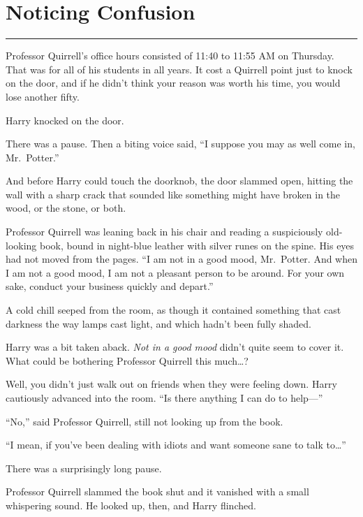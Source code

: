 \chapter{Noticing Confusion}\label{noticing-confusion}

\begin{center}\rule{3in}{0.4pt}\end{center}

Professor Quirrell's office hours consisted of 11:40 to 11:55 AM on
Thursday. That was for all of his students in all years. It cost a
Quirrell point just to knock on the door, and if he didn't think your
reason was worth his time, you would lose another fifty.

Harry knocked on the door.

There was a pause. Then a biting voice said, ``I suppose you may as well
come in, Mr.~Potter.''

And before Harry could touch the doorknob, the door slammed open,
hitting the wall with a sharp crack that sounded like something might
have broken in the wood, or the stone, or both.

Professor Quirrell was leaning back in his chair and reading a
suspiciously old-looking book, bound in night-blue leather with silver
runes on the spine. His eyes had not moved from the pages. ``I am not in
a good mood, Mr.~Potter. And when I am not a good mood, I am not a
pleasant person to be around. For your own sake, conduct your business
quickly and depart.''

A cold chill seeped from the room, as though it contained something that
cast darkness the way lamps cast light, and which hadn't been fully
shaded.

Harry was a bit taken aback. \emph{Not in a good mood} didn't quite seem
to cover it. What could be bothering Professor Quirrell this
much\ldots{}?

Well, you didn't just walk out on friends when they were feeling down.
Harry cautiously advanced into the room. ``Is there anything I can do to
help---''

``No,'' said Professor Quirrell, still not looking up from the book.

``I mean, if you've been dealing with idiots and want someone sane to
talk to\ldots{}''

There was a surprisingly long pause.

Professor Quirrell slammed the book shut and it vanished with a small
whispering sound. He looked up, then, and Harry flinched.


